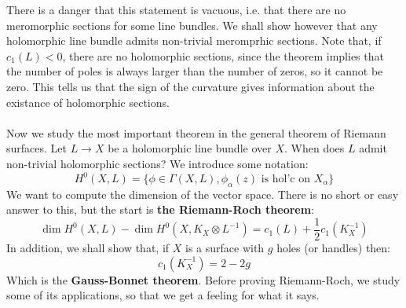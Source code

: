 \documentclass[12 pt]{article}
\theoremstyle{plain}
\theoremstyle{definition}
\theoremstyle{remark}
\begin{document}
There is a danger that this statement is vacuous, i.e. that there are no meromorphic sections for some line bundles. We shall show however that any holomorphic line bundle admits non-trivial meromprhic sections. Note that, if $c_1(L) < 0$, there are no holomorphic sections, since the theorem implies that the number of poles is always larger than the number of zeros, so it cannot be zero. This tells us that the sign of the curvature gives information about the existance of holomorphic sections.
\\
\\
Now we study the most important theorem in the general theorem of Riemann surfaces. Let $L \to X$ be a holomorphic line bundle over $X$. When does $L$ admit non-trivial holomorphic sections? We introduce some notation:
\[       H^0 (X, L) = \{  \phi \in \Gamma(X,L) , \phi_{\alpha}(z) \text{ is hol'c on } X_{\alpha}  \}      \]
We want to compute the dimension of the vector space. There is no short or easy answer to this, but the start is \textbf{the Riemann-Roch theorem}:
\[     \dim H^0(X,L) - \dim H^0(X, K_X \otimes L^{-1})   = c_1(L) + \frac{1}{2} c_1(K_X^{-1})       \]
In addition, we shall show that, if $X$ is a surface with $g$ holes (or handles) then:
\[      c_1(K_X^{-1}) = 2 - 2g     \]
Which is the \textbf{Gauss-Bonnet theorem}. Before proving Riemann-Roch, we study some of its applications, so that we get a feeling for what it says.
\end{document}
